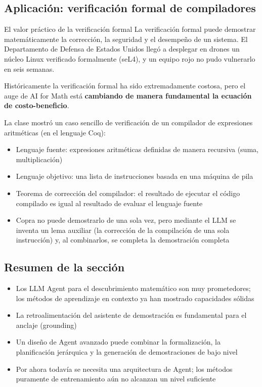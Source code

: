 \subsection{Aplicación: verificación formal de compiladores}

\begin{knowledgebox}{El valor práctico de la verificación formal}
La verificación formal puede demostrar matemáticamente la corrección, la seguridad y el desempeño de un sistema. El Departamento de Defensa de Estados Unidos llegó a desplegar en drones un núcleo Linux verificado formalmente (seL4), y un equipo rojo no pudo vulnerarlo en seis semanas.

Históricamente la verificación formal ha sido extremadamente costosa, pero el auge de AI for Math está \textbf{cambiando de manera fundamental la ecuación de costo-beneficio}.
\end{knowledgebox}

La clase mostró un caso sencillo de verificación de un compilador de expresiones aritméticas (en el lenguaje Coq):
\begin{itemize}
    \item Lenguaje fuente: expresiones aritméticas definidas de manera recursiva (suma, multiplicación)
    \item Lenguaje objetivo: una lista de instrucciones basada en una máquina de pila
    \item Teorema de corrección del compilador: el resultado de ejecutar el código compilado es igual al resultado de evaluar el lenguaje fuente
    \item Copra no puede demostrarlo de una sola vez, pero mediante el LLM se inventa un lema auxiliar (la corrección de la compilación de una sola instrucción) y, al combinarlos, se completa la demostración completa
\end{itemize}

\subsection{Resumen de la sección}

\begin{itemize}
    \item Los LLM Agent para el descubrimiento matemático son muy prometedores; los métodos de aprendizaje en contexto ya han mostrado capacidades sólidas
    \item La retroalimentación del asistente de demostración es fundamental para el anclaje (grounding)
    \item Un diseño de Agent avanzado puede combinar la formalización, la planificación jerárquica y la generación de demostraciones de bajo nivel
    \item Por ahora todavía se necesita una arquitectura de Agent; los métodos puramente de entrenamiento aún no alcanzan un nivel suficiente
\end{itemize}
